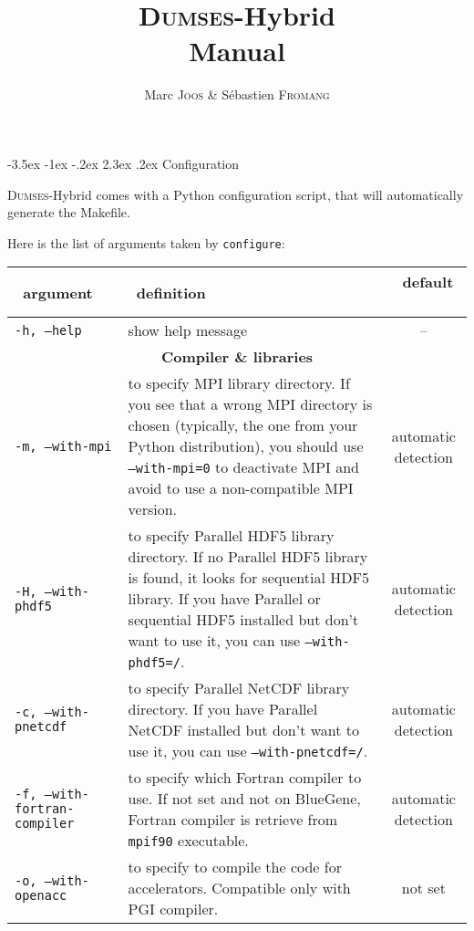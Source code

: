 \documentclass[a4paper,12pt]{article}
\author{Marc \textsc{Joos} \& S\'ebastien \textsc{Fromang}}
\title{\textsc{Dumses}-Hybrid \\ Manual}
\date{ }
\makeatletter
\renewcommand{\section}{\clearpage\@startsection {section}{1}{\z@}%
             {-3.5ex \@plus -1ex \@minus -.2ex}%
             {2.3ex \@plus .2ex}%
             {\normalfont\Large\sffamily\bfseries}}
\makeatother
\begin{document}
    
\vspace*{.5\textwidth}
        {\let\newpage\relax\maketitle}

\section{Configuration}

\textsc{Dumses}-Hybrid comes with a Python configuration script, that will automatically generate the Makefile.

Here is the list of arguments taken by \texttt{configure}:
\begin{table}[h!]
  \centering
  {\footnotesize
    \begin{tabular}{l | p{} | c }
      ~\hfill argument\hfill~ & ~\hfill definition\hfill~ & ~\hfill default \hfill~ \\
      \hline
      \hline
      \texttt{-h, --help} & show help message & -- \\
      \hline
      \multicolumn{3}{c}{\normalsize \bfseries Compiler \& libraries} \\
      \hline
      \texttt{-m, --with-mpi} & to specify MPI library directory. If you see that a wrong MPI directory is chosen (typically, the one from your Python distribution), you should use \texttt{--with-mpi=0} to deactivate MPI and avoid to use a non-compatible MPI version. & automatic detection \\
      \texttt{-H, --with-phdf5} & to specify Parallel HDF5 library directory. If no Parallel HDF5 library is found, it looks for sequential HDF5 library. If you have Parallel or sequential HDF5 installed but don't want to use it, you can use \texttt{--with-phdf5=/}. & automatic detection \\
      \texttt{-c, --with-pnetcdf} & to specify Parallel NetCDF library directory. If you have Parallel NetCDF installed but don't want to use it, you can use \texttt{--with-pnetcdf=/}. & automatic detection \\
      \texttt{-f, --with-fortran-compiler} & to specify which Fortran compiler to use. If not set and not on BlueGene, Fortran compiler is retrieve from \texttt{mpif90} executable. & automatic detection \\
      \texttt{-o, --with-openacc} & to specify to compile the code for accelerators. Compatible only with PGI compiler. & not set \\

\end{tabular}}
\end{table}
\end{document}
